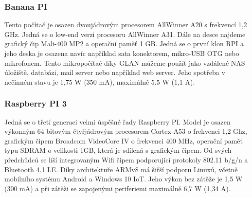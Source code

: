 \subsubsection*{Banana PI}
Tento počítač je osazen dvoujádrovým procesorem AllWinner A20 s frekvencí 1,2 GHz. Jedná se o low-end verzi procesoru AllWinner A31. Dále na desce najdeme grafický čip Mali-400 MP2 a operační paměť 1 GB. Jedná se o první klon RPI a jeho deska je osazena navíc například sata konektorem, mikro-USB OTG nebo mikrofonem. Tento mikropočítač díky GLAN můžeme použít jako vzdálené NAS úložiště, databázi, mail server nebo například web server. Jeho spotřeba v nečinném stavu je 1,75 W (350 mA), maximálně 5.5 W (1,1 A).

\subsubsection*{Raspberry PI 3}
Jedná se o třetí generaci velmi úspěšné řady Raspberry PI. Model je osazen výkonným 64 bitovým čtyřjádrovým procesorem Cortex-A53 o frekvenci 1,2 Ghz, grafickým čipem Broadcom VideoCore IV o frekvenci 400 MHz, operační paměť typu SDRAM o velikosti 1GB, která je sdílená s grafickým čipem. Od svých předchůdců se líší integrovaným Wifi čipem podporující protokoly 802.11 b/g/n a Bluetooth 4.1 LE. Díky architektuře ARMv8 má šiřší podporu Linuxů, včetně mobilního systému Android a Windows 10 IoT. Jeho výkon bez zátěže je 1,5 W (300 mA) a při zátěži se zapojenými periferiemi maximálně 6,7 W (1,34 A).

